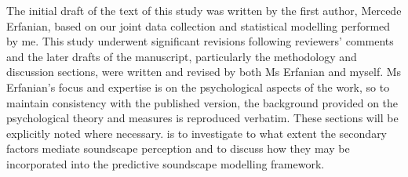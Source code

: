 The initial draft of the text of this study was written by the first author, Mercede Erfanian, based on our joint data collection and statistical modelling performed by me. This study underwent significant revisions following reviewers' comments and the later drafts of the manuscript, particularly the methodology and discussion sections, were written and revised by both Ms Erfanian and myself. Ms Erfanian's focus and expertise is on the psychological aspects of the work, so to maintain consistency with the published version, the background provided on the psychological theory and measures is reproduced verbatim. These sections will be explicitly noted where necessary. is to investigate to what extent the secondary factors mediate soundscape perception and to discuss how they may be incorporated into the predictive soundscape modelling framework.


